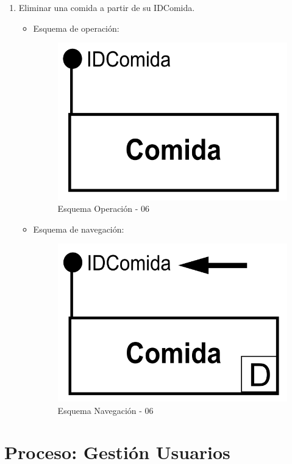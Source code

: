 \documentclass[a4paper,12pt]{report}
\begin{document}
\begin{enumerate}
\item Eliminar una comida a partir de su IDComida.
\begin{itemize}
\item Esquema de operación:
\begin{figure}[!htp]
\centering
\includegraphics[width=0.5\linewidth]{./operaciones/img/Comidas/06_ope.png}
\caption{Esquema Operación - 06}
\label{fig:ope06}
\medskip
\footnotesize
{}
\end{figure}
\item Esquema de navegación:
\begin{figure}[!htp]
\centering
\includegraphics[width=0.5\linewidth]{./operaciones/img/Comidas/06_nav.png}
\caption{Esquema Navegación - 06}
\label{fig:nave06}
\medskip
\footnotesize
{}
\end{figure}
\end{itemize}
\end{enumerate}
\section{Proceso: Gestión Usuarios}
\label{sec-7-8}
\end{document}
